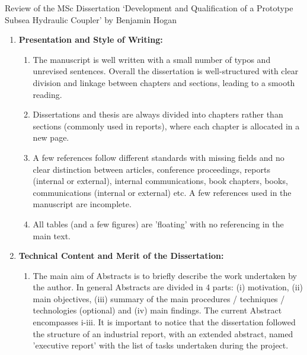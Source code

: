 \documentclass[14pt,twoside]{report}
\begin{document}

\bigskip

\begin{center}
{\Large Review of the MSc Dissertation `Development and Qualification of a Prototype Subsea Hydraulic Coupler' by Benjamin Hogan}
\end{center}

\medskip

\begin{enumerate}
%
    \item {\bf Presentation and Style of Writing:}
                \begin{enumerate}
                   \item The manuscript is well written with a small number of typos and unrevised sentences. Overall the dissertation is well-structured with clear division and linkage between chapters and sections, leading to a smooth reading.
                   \item Dissertations and thesis are always divided into chapters rather than sections (commonly used in reports), where each chapter is allocated in a new page.
                   \item A few references follow different standards with missing fields and no clear distinction between articles, conference proceedings, reports (internal or external), internal communications, book chapters, books, communications (internal or external) etc.  A few references used in the manuscript are incomplete.
                   \item All tables (and a few figures) are 'floating' with no referencing in the main text.
                \end{enumerate}
%
    \item {\bf Technical Content and Merit of the Dissertation:}
                \begin{enumerate}
                   \item The main aim of Abstracts is to briefly describe the work undertaken by the author. In general Abstracts are divided in 4 parts: (i) motivation, (ii) main objectives, (iii) summary of the main procedures / techniques / technologies (optional) and (iv) main findings. The current Abstract encompasses i-iii. It is important to notice that the dissertation followed the structure of an industrial report, with an extended abstract, named 'executive report' with the list of tasks undertaken during the project.


\end{enumerate}
\end{enumerate}
\end{document}

